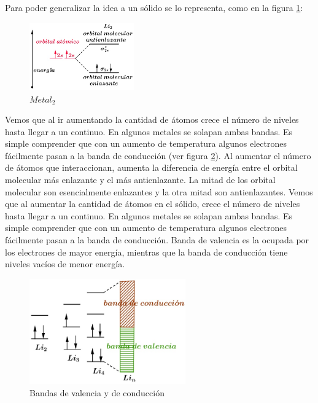 Para poder generalizar la idea a un sólido se lo representa, como en la figura \ref{fig:342}:

\begin{figure}[H]
    \centering
    \includegraphics[width=0.4\textwidth]{./Figures/fig342}
	\caption{$Metal_{2}$}
	\label{fig:342}
\end{figure}


Vemos que al ir aumentando la cantidad de átomos crece el número de niveles hasta llegar a un continuo. En algunos metales se solapan ambas bandas. Es simple comprender que con un aumento de temperatura algunos electrones fácilmente pasan a la banda de conducción (ver figura \ref{fig:343}). Al aumentar el número de átomos que interaccionan, aumenta la diferencia de energía entre el orbital molecular más enlazante y el más antienlazante. La mitad de los orbital molecular son esencialmente enlazantes y la otra mitad son antienlazantes. Vemos que al aumentar la cantidad de átomos en el sólido, crece el número de niveles hasta llegar a un continuo. En algunos metales se solapan ambas bandas. Es simple comprender que con un aumento de temperatura algunos electrones fácilmente pasan a la banda de conducción. Banda de valencia es la ocupada por los electrones de mayor energía, mientras que la banda de conducción tiene niveles vacíos de menor energía.

\begin{figure}[H]
    \centering
    \includegraphics[width=0.6\textwidth]{./Figures/fig343}
	\caption{Bandas de valencia y de conducción}
	\label{fig:343}
\end{figure}

